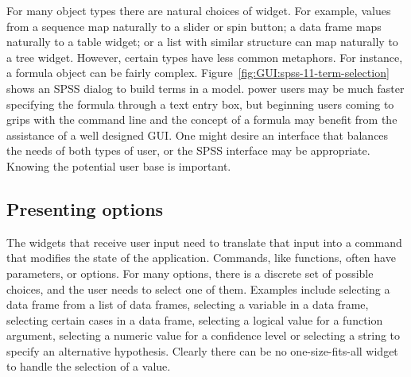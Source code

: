 For many \R\/ object types there are natural choices of widget. For
example, values from a sequence map naturally to a slider or spin
button; a data frame maps naturally to a table widget; or a list with
similar structure can map naturally to a tree widget. However, certain
\R\/ types have less common metaphors. For instance, a formula object
can be fairly complex. Figure~\ref{fig:GUI:spss-11-term-selection}
shows an SPSS dialog to build terms in a model. \R\/ power users may
be much faster specifying the formula through a text entry box, but
beginning \R\/ users coming to grips with the command line and the
concept of a formula may benefit from the assistance of a well
designed GUI. One might desire an interface that balances the needs of
both types of user, or the SPSS interface may be appropriate. Knowing
the potential user base is important.






\subsection{Presenting options}
\label{sec:GUI:basic-selection}

The widgets that receive user input need to translate that input into
a command that modifies the state of the application. Commands, like
\R{} functions, often have parameters, or options. For many options,
there is a discrete set of possible choices, and the user needs to
select one of them. Examples include selecting a data frame from a list of data
frames, selecting a variable in a data frame, selecting certain cases
in a data frame, selecting a logical value for a function argument,
selecting a numeric value for a confidence level or selecting a string
to specify an alternative hypothesis. Clearly there can be no
one-size-fits-all widget to handle the selection of a value.



